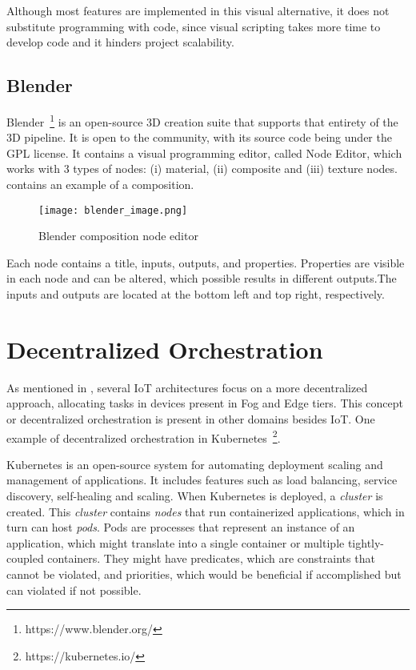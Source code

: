Although most features are implemented in this visual alternative, it does not substitute programming with code, since visual scripting takes more time to develop code and it hinders project scalability.

\subsection{Blender}\label{sec:blender}

Blender~\footnote{https://www.blender.org/} is an open-source 3D creation suite that supports that entirety of the 3D pipeline. It is open to the community, with its source code being under the GPL license. It contains a visual programming editor, called Node Editor, which works with 3 types of nodes: (i) material, (ii) composite and (iii) texture nodes.  contains an example of a composition.

\begin{figure}[!ht]
\centering
\texttt{[image: blender\_image.png]}
\caption[Blender composition node editor]{Blender composition node editor~\cite{blender_image}}
\label{fig:blender}
\end{figure}

Each node contains a title, inputs, outputs, and properties. Properties are visible in each node and can be altered, which possible results in different outputs.The inputs and outputs are located at the bottom left and top right, respectively. 

\section{Decentralized Orchestration}\label{sec:background_decentralized_orchestration}

As mentioned in , several IoT architectures focus on a more decentralized approach, allocating tasks in devices present in Fog and Edge tiers. This concept or decentralized orchestration is present in other domains besides IoT. One example of decentralized orchestration in Kubernetes~\footnote{https://kubernetes.io/}.

Kubernetes is an open-source system for automating deployment scaling and management of applications. It includes features such as load balancing, service discovery, self-healing and scaling. When Kubernetes is deployed, a \textit{cluster} is created. This \textit{cluster} contains \textit{nodes} that run containerized applications, which in turn can host \textit{pods}. Pods are processes that represent an instance of an application, which might translate into a single container or multiple tightly-coupled containers. They might have predicates, which are constraints that cannot be violated, and priorities, which would be beneficial if accomplished but can violated if not possible.

